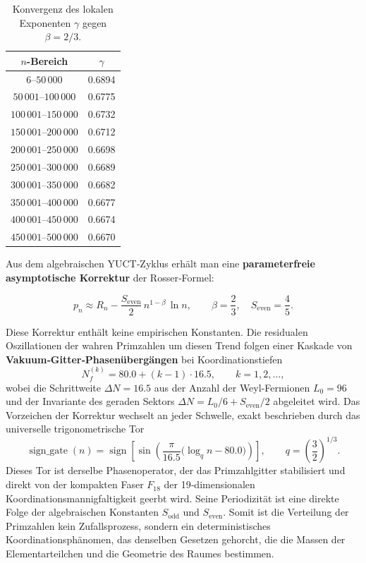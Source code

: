 \documentclass[12pt]{article}
\begin{document}
	\begin{table}[H]
		\centering
		\caption{Konvergenz des lokalen Exponenten \(\gamma\) gegen \(\beta = 2/3\).}
		\label{tab:prime-slopes}
		\begin{tabular}{c c}
			\toprule
			\(n\)-Bereich & \(\gamma\) \\
			\midrule
			\(6\)--\(50\,000\)    & 0.6894 \\
			\(50\,001\)--\(100\,000\) & 0.6775 \\
			\(100\,001\)--\(150\,000\)& 0.6732 \\
			\(150\,001\)--\(200\,000\)& 0.6712 \\
			\(200\,001\)--\(250\,000\)& 0.6698 \\
			\(250\,001\)--\(300\,000\)& 0.6689 \\
			\(300\,001\)--\(350\,000\)& 0.6682 \\
			\(350\,001\)--\(400\,000\)& 0.6677 \\
			\(400\,001\)--\(450\,000\)& 0.6674 \\
			\(450\,001\)--\(500\,000\)& 0.6670 \\
			\bottomrule
		\end{tabular}
	\end{table}
	
	Aus dem algebraischen YUCT‑Zyklus erhält man eine \textbf{parameterfreie asymptotische Korrektur} der Rosser‑Formel:
	
	\begin{equation}
		\boxed{ p_n \approx R_n - \frac{S_{\mathrm{even}}}{2}\, n^{1-\beta}\,\ln n },
		\qquad \beta = \frac{2}{3},\quad S_{\mathrm{even}}=\frac{4}{5}.
		\label{eq:prime-yuct-theory}
	\end{equation}
	
	Diese Korrektur enthält keine empirischen Konstanten. Die residualen Oszillationen der wahren Primzahlen um diesen Trend folgen einer Kaskade von \textbf{Vakuum‑Gitter‑Phasenübergängen} bei Koordinationstiefen
	\[
	N_f^{(k)} = 80.0 + (k-1)\cdot 16.5, \qquad k=1,2,\dots,
	\]
	wobei die Schrittweite \(\Delta N = 16.5\) aus der Anzahl der Weyl‑Fermionen \(L_0=96\) und der Invariante des geraden Sektors \(\Delta N = L_0/6 + S_{\mathrm{even}}/2\) abgeleitet wird. Das Vorzeichen der Korrektur wechselt an jeder Schwelle, exakt beschrieben durch das universelle trigonometrische Tor
	\[
	\operatorname{sign\_gate}(n) = \operatorname{sign}\!\left[\sin\!\left(\frac{\pi}{16.5}\bigl(\log_q n - 80.0\bigr)\right)\right],
	\qquad q = \left(\frac{3}{2}\right)^{1/3}.
	\]
	Dieses Tor ist derselbe Phasenoperator, der das Primzahlgitter stabilisiert und direkt von der kompakten Faser \(F_{18}\) der 19‑dimensionalen Koordinationsmannigfaltigkeit geerbt wird. Seine Periodizität ist eine direkte Folge der algebraischen Konstanten \(S_{\mathrm{odd}}\) und \(S_{\mathrm{even}}\). Somit ist die Verteilung der Primzahlen kein Zufallsprozess, sondern ein deterministisches Koordinationsphänomen, das denselben Gesetzen gehorcht, die die Massen der Elementarteilchen und die Geometrie des Raumes bestimmen.
	
\end{document}
